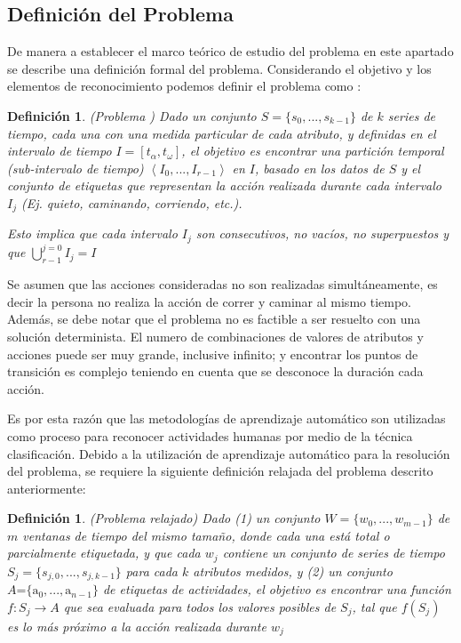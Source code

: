 \subsection{Definición del Problema}

\label{sec261:definicion-har}De manera a establecer el marco teórico
de estudio del problema  en este apartado se describe una
definición formal del problema. Considerando el objetivo y los elementos
de reconocimiento podemos definir el problema como \cite{LaraLabrador2013}:

\label{def2:harp}\newtheorem{defs}{Definición}

\begin{defs}(Problema ) Dado un conjunto $S=\{s_{0},...,s_{k-1}\}$
de $k$ series de tiempo, cada una con una medida particular de cada
atributo, y definidas en el intervalo de tiempo $I=\left[t_{\alpha},t_{\omega}\right]$,
el objetivo es encontrar una partición temporal (\emph{sub}-intervalo
de tiempo) $\left\langle I_{0},...,I_{r-1}\right\rangle $ en $I$,
basado en los datos de $S$ y el conjunto de etiquetas que representan
la acción realizada durante cada intervalo $I_{j}$ (Ej. quieto, caminando,
corriendo, etc.). 

Esto implica que cada intervalo $I_{j}$ son consecutivos, no vacíos,
no superpuestos y que ${\displaystyle \bigcup_{r-1}^{j=0}{I_{j}=I}}$
\end{defs}

Se asumen que las acciones consideradas no son realizadas simultáneamente,
es decir la persona no realiza la acción de correr y caminar al mismo
tiempo. Además, se debe notar que el problema  no es factible
a ser resuelto con una solución determinista. El numero de combinaciones
de valores de atributos y acciones puede ser muy grande, inclusive
infinito; y encontrar los puntos de transición es complejo teniendo
en cuenta que se desconoce la duración cada acción. 

Es por esta razón que las metodologías de aprendizaje automático son
utilizadas como proceso para reconocer actividades humanas por medio
de la técnica clasificación. Debido a la utilización de aprendizaje
automático para la resolución del problema, se requiere la siguiente
definición relajada del problema  descrito anteriormente: 

\label{def2:harp-rel}\newtheorem{defs}{Definición}

\begin{defs}(Problema  relajado) Dado (1) un conjunto
$W=\{w_{0},...,w_{m-1}\}$ de $m$ ventanas de tiempo del mismo tamaño,
donde cada una está total o parcialmente etiquetada, y que cada $w_{j}$
contiene un conjunto de series de tiempo $S_{j}=\{s_{j,0},...,s_{j,k-1}\}$
para cada $k$ atributos medidos, y (2) un conjunto $A\text{=}\{\mathrm{a}_{0},...,\mathrm{a}_{n-1}\}$
de etiquetas de actividades, el objetivo es encontrar una función
$f\colon S_{j}\rightarrow A$ que sea evaluada para todos los valores
posibles de $S_{j}$, tal que $f(S_{j})$ es lo más próximo a la acción
realizada durante $w_{j}$ \end{defs}

